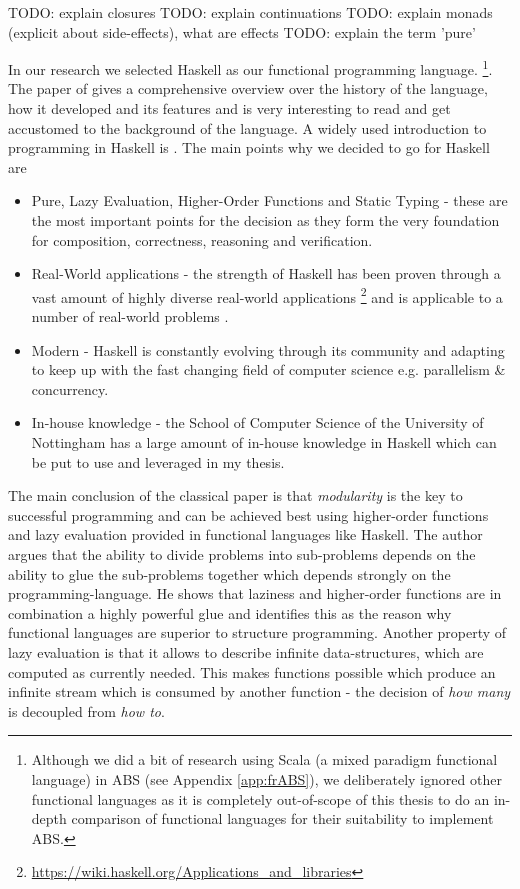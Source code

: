 TODO: explain closures
TODO: explain continuations
TODO: explain monads (explicit about side-effects), what are effects
TODO: explain the term 'pure'

In our research we selected Haskell as our functional programming language. \footnote{Although we did a bit of research using Scala (a mixed paradigm functional language) in ABS (see Appendix \ref{app:frABS}), we deliberately ignored other functional languages as it is completely out-of-scope of this thesis to do an in-depth comparison of functional languages for their suitability to implement ABS.}. The paper of \cite{hudak_history_2007} gives a comprehensive overview over the history of the language, how it developed and its features and is very interesting to read and get accustomed to the background of the language. A widely used introduction to programming in Haskell is \cite{hutton_programming_2016}. The main points why we decided to go for Haskell are

\begin{itemize}
	\item Pure, Lazy Evaluation, Higher-Order Functions and Static Typing - these are the most important points for the decision as they form the very foundation for composition, correctness, reasoning and verification. 
	\item Real-World applications - the strength of Haskell has been proven through a vast amount of highly diverse real-world applications \footnote{\url{https://wiki.haskell.org/Applications_and_libraries}} \cite{hudak_history_2007} and is applicable to a number of real-world problems \cite{osullivan_real_2008}.
	\item Modern - Haskell is constantly evolving through its community and adapting to keep up with the fast changing field of computer science e.g. parallelism \& concurrency.
	\item In-house knowledge - the School of Computer Science of the University of Nottingham has a large amount of in-house knowledge in Haskell which can be put to use and leveraged in my thesis.
\end{itemize}

The main conclusion of the classical paper \cite{hughes_why_1989} is that \textit{modularity} is the key to successful programming and can be achieved best using higher-order functions and lazy evaluation provided in functional languages like Haskell. The author argues that the ability to divide problems into sub-problems depends on the ability to glue the sub-problems together which depends strongly on the programming-language. He shows that laziness and higher-order functions are in combination a highly powerful glue and identifies this as the reason why functional languages are superior to structure programming. Another property of lazy evaluation is that it allows to describe infinite data-structures, which are computed as currently needed. This makes functions possible which produce an infinite stream which is consumed by another function - the decision of \textit{how many} is decoupled from \textit{how to}.

